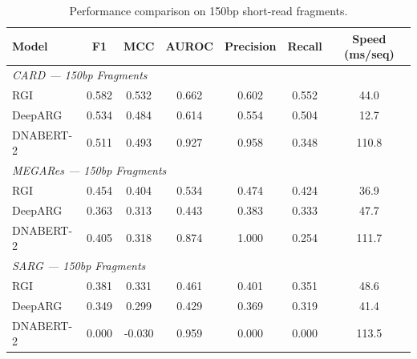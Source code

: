 \begin{table}[t]
\centering
\caption{Performance comparison on 150bp short-read fragments.}
\label{tab:fragment_results}
\begin{tabular}{l cccccc}
\toprule
Model & F1 & MCC & AUROC & Precision & Recall & Speed (ms/seq) \\
\midrule
\multicolumn{7}{l}{\textit{CARD — 150bp Fragments}} \\
RGI & 0.582 & 0.532 & 0.662 & 0.602 & 0.552 & 44.0 \\
DeepARG & 0.534 & 0.484 & 0.614 & 0.554 & 0.504 & 12.7 \\
DNABERT-2 & 0.511 & 0.493 & 0.927 & 0.958 & 0.348 & 110.8 \\
\midrule
\multicolumn{7}{l}{\textit{MEGARes — 150bp Fragments}} \\
RGI & 0.454 & 0.404 & 0.534 & 0.474 & 0.424 & 36.9 \\
DeepARG & 0.363 & 0.313 & 0.443 & 0.383 & 0.333 & 47.7 \\
DNABERT-2 & 0.405 & 0.318 & 0.874 & 1.000 & 0.254 & 111.7 \\
\midrule
\multicolumn{7}{l}{\textit{SARG — 150bp Fragments}} \\
RGI & 0.381 & 0.331 & 0.461 & 0.401 & 0.351 & 48.6 \\
DeepARG & 0.349 & 0.299 & 0.429 & 0.369 & 0.319 & 41.4 \\
DNABERT-2 & 0.000 & -0.030 & 0.959 & 0.000 & 0.000 & 113.5 \\
\bottomrule
\end{tabular}
\end{table}